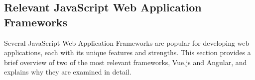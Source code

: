 \documentclass[conference]{IEEEtran}
\begin{document}
\subsection{Relevant JavaScript Web Application Frameworks}

Several JavaScript Web Application Frameworks are popular for developing web applications, each with its unique features and strengths. This section provides a brief overview of two of the most relevant frameworks, Vue.js and Angular, and explains why they are examined in detail.






\end{document}
